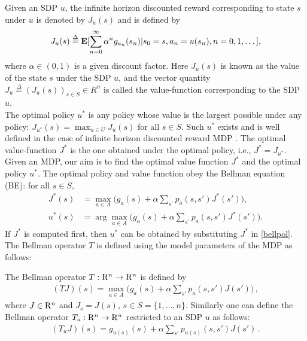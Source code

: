 Given an SDP $u$, the infinite horizon discounted reward corresponding to state $s$ under $u$ is denoted by $J_u(s)$ and is defined by
\begin{align}
J_u(s)\stackrel{\Delta}{=}\mathbf{E}[\sum_{n=0}^\infty \alpha^n g_{a_n}(s_n)|s_0=s,a_n=u(s_n), n= 0,1,\dots],\nonumber
\end{align}
where $\alpha \in (0,1)$ is a given discount factor. Here $J_u(s)$ is known as the value of the state $s$ under the SDP $u$, and the vector quantity $J_u\stackrel{\Delta}{=}(J_u(s))_{s\in S}\in R^n$ is called the value-function corresponding to the SDP $u$.\\
The optimal policy $u^*$ is any policy whose value is the largest possible under any policy: 
$J_{u^*}(s) = \max_{u\in U} J_u(s)$ for all $s\in S$. Such $u^*$ exists and is well defined in the case of infinite horizon discounted reward MDP \cite{Puter}.
 The optimal value-function $J^*$ is the one obtained under the optimal policy, i.e., $J^*=J_{u^*}$. 
Given an MDP, our aim is to find the optimal value function $J^*$ and the optimal policy $u^*$. The optimal policy and value function obey the Bellman equation (BE): for all $ s \in S$, 
\begin{subequations}\label{bell}
\begin{align}
\label{bellval}J^*(s)&=\max_{ a\in A}\big(g_a(s)+\alpha \sum_{s'}p_a(s,s')J^*(s')\big),\\
\label{bellpol}u^*(s)&=\arg\max_{ a\in A}\big(g_a(s)+\alpha \sum_{s'}p_a(s,s')J^*(s')\big).
\end{align}
\end{subequations}
If $J^*$ is computed first, then $u^*$ can be obtained by substituting $J^*$ in \eqref{bellpol}. The Bellman operator $T$ is defined using the model parameters of the MDP as follows:
\begin{definition}
The Bellman operator $T: \mathrm{R}^n \to \mathrm{R}^n$ is defined by 
\begin{align}
(TJ)(s)=\max_{a \in A}\big(g_a(s)+\alpha \sum_{s'} p_a(s,s')J(s')\big)\,, 
\end{align}
where $J\in \mathrm{R}^n$ and $J_s = J(s)$, $s\in S = \{1,\dots,n\}$.  
Similarly one can define the Bellman operator $T_u:\mathrm{R}^n \to \mathrm{R}^n$ restricted to an SDP $u$ as follows:
\begin{align}
(T_uJ)(s)=g_{u(s)}(s)+\alpha \sum_{s'} p_{u(s)}(s,s')J(s')\,.
\end{align}
\end{definition}
